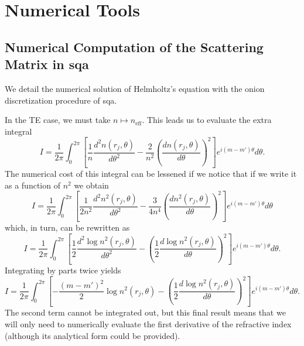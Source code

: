 \chapter{Numerical Tools}

\section{Numerical Computation of the Scattering Matrix in \gls{sqa}}\label{sec:app.numTools.scatMat}
We detail the numerical solution of Helmholtz's equation with the onion discretization 
procedure of \gls{sqa}.

In the TE case, we must take $n\mapsto n_\text{eff}$. This leads us to evaluate the 
extra integral
  \begin{equation}
   I = \frac{1}{2\pi}\int_0^{2\pi}\left[\frac{1}{n}\frac{d^2n(r_j,\theta)}{d\theta^2}-\frac{2}{n^2}\left(\frac{dn(r_j,\theta)}{d\theta}\right)^2\right]e^{i(m-m')\theta}d\theta.
  \end{equation}
The numerical cost of this integral can be lessened 
if we notice that if we write it as a function of $n^2$ we obtain
  \begin{equation}
   I = \frac{1}{2\pi}\int_0^{2\pi}\left[\frac{1}{2n^2}\frac{d^2n^2(r_j,\theta)}{d\theta^2}-\frac{3}{4n^4}\left(\frac{dn^2(r_j,\theta)}{d\theta}\right)^2\right]e^{i(m-m')\theta}d\theta
  \end{equation}
which, in turn, can be rewritten as
  \begin{equation}
   I = \frac{1}{2\pi}\int_0^{2\pi}\left[\frac{1}{2}\frac{d^2\log n^2(r_j,\theta)}{d\theta^2}-\left(\frac{1}{2}\frac{d\log n^2(r_j,\theta)}{d\theta}\right)^2\right]e^{i(m-m')\theta}d\theta.
  \end{equation}
Integrating by parts twice yields
  \begin{equation}
   I = \frac{1}{2\pi}\int_0^{2\pi}\left[-\frac{(m-m')^2}{2}\log n^2(r_j,\theta)-\left(\frac{1}{2}\frac{d\log n^2(r_j,\theta)}{d\theta}\right)^2\right]e^{i(m-m')\theta}d\theta.
  \end{equation}
The second term cannot be integrated out, but this final result means that
we will only need to numerically evaluate the first derivative of the 
refractive index (although its analytical form could be provided).

